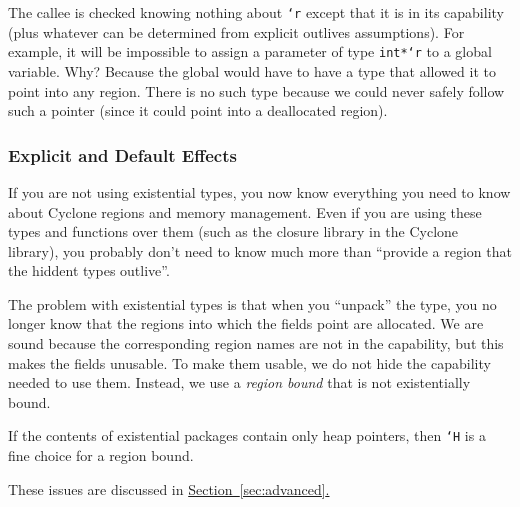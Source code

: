 The callee is checked knowing nothing about \texttt{`r} except that it
is in its capability (plus whatever can be determined from explicit
outlives assumptions).  For example, it will be impossible to assign a
parameter of type \texttt{int*`r} to a global variable.  Why?  Because
the global would have to have a type that allowed it to point into any
region.  There is no such type because we could never safely follow
such a pointer (since it could point into a deallocated region).

\subsubsection{Explicit and Default Effects}

If you are not using existential types, you now know everything you
need to know about Cyclone regions and memory management.  Even if you
are using these types and functions over them (such as the closure
library in the Cyclone library), you probably don't need to know much more
than ``provide a region that the hiddent types outlive''.

The problem with existential types is that when you ``unpack'' the
type, you no longer know that the regions into which the fields point
are allocated.  We are sound because the corresponding region names
are not in the capability, but this makes the fields unusable.  To
make them usable, we do not hide the capability needed to use them.
Instead, we use a \emph{region bound} that is not existentially
bound.  

If the contents of existential packages contain only heap pointers,
then \texttt{`H} is a fine choice for a region bound.

These issues are discussed in
\hyperref[sec:advanced]{Section~\ref{sec:advanced}.}




